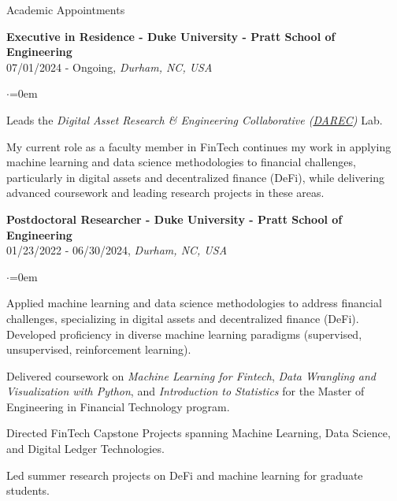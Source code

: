 \documentclass{resume} %
\begin{document}
\begin{rSection}{Academic Appointments}

{\bf Executive in Residence - Duke University - Pratt School of Engineering} \\
\smallskip
{07/01/2024 - Ongoing}, {\em Durham, NC, USA} \\
\begin{list}{$\cdot$}{\leftmargin=0em}
\item Leads the \textit{Digital Asset Research \& Engineering Collaborative (\href{https://darec.duke.edu/}{DAREC})} Lab.
\item My current role as a faculty member in FinTech continues my work in applying machine learning and data science methodologies to financial challenges, particularly in digital assets and decentralized finance (DeFi), while delivering advanced coursework and leading research projects in these areas.
\end{list}

{\bf Postdoctoral Researcher - Duke University - Pratt School of Engineering} \\
{01/23/2022 - 06/30/2024}, {\em Durham, NC, USA} \\
\begin{list}{$\cdot$}{\leftmargin=0em}
\item Applied machine learning and data science methodologies to address financial challenges, specializing in digital assets and decentralized finance (DeFi). Developed proficiency in diverse machine learning paradigms (supervised, unsupervised, reinforcement learning).
\item Delivered coursework on \emph{Machine Learning for Fintech}, \emph{Data Wrangling and Visualization with Python}, and \emph{Introduction to Statistics} for the Master of Engineering in Financial Technology program.
\item Directed FinTech Capstone Projects spanning Machine Learning, Data Science, and Digital Ledger Technologies.
\item Led summer research projects on DeFi and machine learning for graduate students.
\end{list}
\end{rSection}
\end{document}
